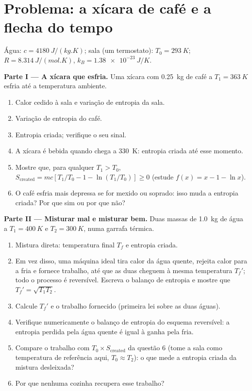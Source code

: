 \section{Problema: a xícara de café e a flecha do tempo}

\begin{problem}
\label{pb:b1:second-law-entropy:1}
Água: $c = \qty{4180}{J/(kg.K)}$; sala (um termostato): $T_0 = \qty{293}{K}$;
$R = \qty{8.314}{J/(mol.K)}$, $k_B = \qty{1.38e-23}{J/K}$.

\medskip
\noindent\textbf{Parte I --- A xícara que esfria.}
Uma xícara com \qty{0.25}{kg} de café a $T_1 = \qty{363}{K}$ esfria até a
temperatura ambiente.
\begin{enumerate}
  \item Calor cedido à sala e variação de entropia da sala.
  \item Variação de entropia do café.
  \item Entropia criada; verifique o seu sinal.
  \item A xícara é bebida quando chega a \qty{330}{K}: entropia criada até
        esse momento.
  \item Mostre que, para qualquer $T_1 > T_0$, $S_{\mathrm{created}} = mc[T_1/T_0 - 1 -
        \ln(T_1/T_0)] \geq 0$ (estude $f(x) = x - 1 - \ln x$).
  \item O café esfria mais depressa se for mexido ou soprado: isso muda a
        entropia criada? Por que sim ou por que não?
\end{enumerate}

\medskip
\noindent\textbf{Parte II --- Misturar mal e misturar bem.}
Duas massas de \qty{1.0}{kg} de água a $T_1 = \qty{400}{K}$ e $T_2 =
\qty{300}{K}$, numa garrafa térmica.
\begin{enumerate}[resume]
  \item Mistura direta: temperatura final $T_f$ e entropia criada.
  \item Em vez disso, uma máquina ideal tira calor da água quente, rejeita
        calor para a fria e fornece trabalho, até que as duas cheguem à mesma
        temperatura $T_f'$; todo o processo é reversível. Escreva o
        balanço de entropia e mostre que $T_f' = \sqrt{T_1T_2}$.
  \item Calcule $T_f'$ e o trabalho fornecido (primeira lei sobre as duas
        águas).
  \item Verifique numericamente o balanço de entropia do esquema
        reversível: a entropia perdida pela água quente é igual à ganha pela fria.
  \item Compare o trabalho com $T_0 \times S_{\mathrm{created}}$ da questão 6
        (tome a sala como temperatura de referência aqui, $T_0 \approx T_2$):
        o que mede a entropia criada da mistura desleixada?
  \item Por que nenhuma cozinha recupera esse trabalho?
\end{enumerate}


\end{problem}

